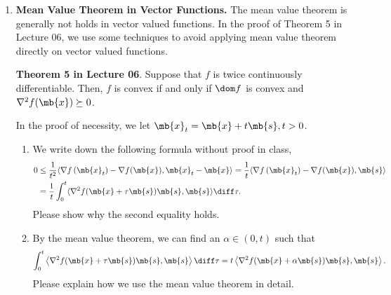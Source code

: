 \begin{exercise}
  \begin{enumerate}
    \item \textbf{Mean Value Theorem in Vector Functions.}
      The mean value theorem is generally not holds in vector valued functions. In the proof of Theorem 5 in Lecture 06, we use some techniques to avoid applying mean value theorem directly on vector valued functions.
      
      \noindent\textbf{Theorem 5 in Lecture 06}. Suppose that $f$ is twice continuously differentiable. Then, $f$ is convex if and only if $\dom  f$ is convex and  $\nabla^{2} f(\mb{x}) \succeq 0$.
      
      In the proof of necessity, we let $\mb{x}_t=\mb{x}+t\mb{s}, t>0$.
      
      \begin{enumerate}
        \item We write down the following formula without proof in class,
          \begin{align*}
            0 & \le \frac{1}{t^{2}}\langle\nabla f\left(\mb{x}_{t}\right)-\nabla f(\mb{x}), \mb{x}_{t}-\mb{x}\rangle=\frac{1}{t}\langle\nabla f\left(\mb{x}_{t}\right)-\nabla f(\mb{x}), \mb{s}\rangle \\
              & =\frac{1}{t} \int_{0}^{t}\langle\nabla^{2} f(\mb{x}+\tau \mb{s}) \mb{s}, \mb{s}\rangle \diff \tau .
          \end{align*}
          Please show why the second equality holds.
        \item By the mean value theorem, we can find an $\alpha \in(0, t)$ such that
          \begin{align*}
            \int_{0}^{t}\left\langle\nabla^{2} f(\mb{x}+\tau \mb{s}) \mb{s}, \mb{s}\right\rangle \diff\tau=t\left\langle\nabla^{2} f(\mb{x}+\alpha \mb{s}) \mb{s}, \mb{s}\right\rangle.
          \end{align*}
          Please explain how we use the mean value theorem in detail.
      \end{enumerate}
      

\end{enumerate}
\end{exercise}
